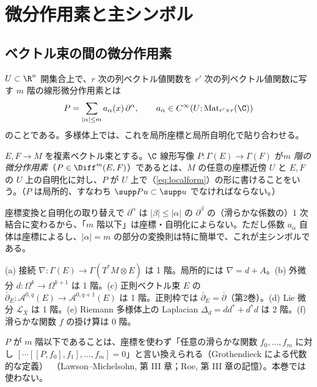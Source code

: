 \section{微分作用素と主シンボル}\label{sec:symbol}
\subsection{ベクトル束の間の微分作用素}
$U\subset\R^n$ 開集合上で、$r$ 次の列ベクトル値関数を $r'$ 次の列ベクトル値関数に写す $m$ 階の線形微分作用素とは
\begin{equation}\label{eq:localform}
P=\sum_{|\alpha|\le m}a_\alpha(x)\,\partial^\alpha,\qquad a_\alpha\in C^\infty(U;\mathrm{Mat}_{r'\times r}(\C))
\end{equation}
のことである。多様体上では、これを局所座標と局所自明化で貼り合わせる。

\begin{defn}[微分作用素]\label{def:diffop}
$E,F\to M$ を複素ベクトル束とする。$\C$ 線形写像 $P:\Gamma(E)\to\Gamma(F)$ が\emph{$m$ 階の微分作用素}（$P\in\Diff^m(E,F)$）であるとは、$M$ の任意の座標近傍 $U$ と $E,F$ の $U$ 上の自明化に対し、$P$ が $U$ 上で（\ref{eq:localform}）の形に書けることをいう。（$P$ は局所的、すなわち $\supp Pu\subset\supp u$ でなければならない。）
\end{defn}
座標変換と自明化の取り替えで $\partial^\alpha$ は $|\beta|\le|\alpha|$ の $\partial^\beta$ の（滑らかな係数の）1 次結合に変わるから、「$m$ 階以下」は座標・自明化によらない。ただし係数 $a_\alpha$ 自体は座標によるし、$|\alpha|=m$ の部分の変換則は特に簡単で、これが主シンボルである。
\begin{ex}\label{ex:diffops}
(a) 接続 $\nabla:\Gamma(E)\to\Gamma(T^*M\otimes E)$ は 1 階。局所的には $\nabla=d+A$。(b) 外微分 $d:\Omega^k\to\Omega^{k+1}$ は 1 階。(c) 正則ベクトル束 $E$ の $\bar\partial_E:\mathcal A^{0,q}(E)\to\mathcal A^{0,q+1}(E)$ は 1 階。正則枠では $\bar\partial_E=\bar\partial$（第2巻）。(d) Lie 微分 $\mathcal L_X$ は 1 階。(e) Riemann 多様体上の Laplacian $\Delta_d=dd^*+d^*d$ は 2 階。(f) 滑らかな関数 $f$ の掛け算は $0$ 階。
\end{ex}
\begin{rem}
$P$ が $m$ 階以下であることは、座標を使わず「任意の滑らかな関数 $f_0,\dots,f_m$ に対し $[\cdots[[P,f_0],f_1],\dots,f_m]=0$」と言い換えられる（Grothendieck による代数的な定義）\tC\ （Lawson--Michelsohn, 第 III 章；Roe, 第 III 章の記憶\tQ）。本巻では使わない。
\end{rem}

